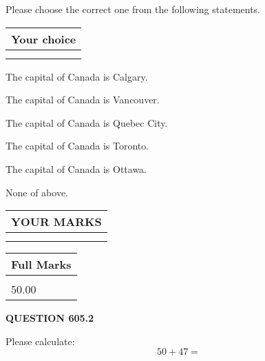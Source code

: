 \documentclass[12pt]{article}
\begin{document}
  
Please choose the correct one from the following statements.
  
  
\noindent\hspace{3.0in} \begin{tabular}{|l|}
\hline
Your choice \\
\hline
 \\ 
 \\ 
\hline
\end{tabular}
  
  
 
 
The capital of Canada is Calgary.
 
 
The capital of Canada is Vancouver.
 
 
The capital of Canada is Quebec City.
 
 
The capital of Canada is Toronto.
 
 
The capital of Canada is Ottawa.
 
 
 None of above.
 
 
  
\vspace{0.2in}
  
\noindent\begin{tabular}{|l|}
\hline
 YOUR MARKS  \\
\hline
 \\ 
 \\ 
\hline
\end{tabular}
\hspace{0.05in} \begin{tabular}{|l|}
\hline
 Full Marks  \\
\hline
 \\ 
50.00 \\
\hline
\end{tabular}
{\textbf{\Large{QUESTION
605.2 
}}}
  
  
 
Please calculate:
\begin{equation}
50 +  %
47 = \nonumber
\end{equation}
 

 

 
   
   
 \vspace{0.2in}
 
   
   
   
   
\end{document}
